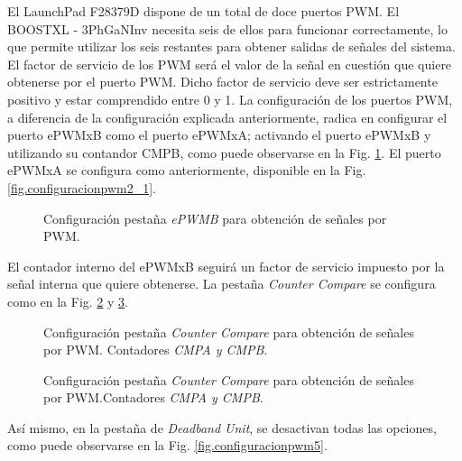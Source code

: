 \documentclass{report}
\begin{document}
El LaunchPad F28379D dispone de un total de doce puertos PWM. El BOOSTXL - 3PhGaNInv necesita seis de ellos para funcionar correctamente, lo que permite utilizar los seis restantes para obtener salidas de señales del sistema. El factor de servicio de los PWM será el valor de la señal en cuestión que quiere obtenerse por el puerto PWM. Dicho factor de servicio deve ser estrictamente positivo y estar comprendido entre 0 y 1.
La configuración de los puertos PWM, a diferencia de la configuración explicada anteriormente, radica en configurar el puerto ePWMxB como el puerto ePWMxA; activando el puerto ePWMxB y utilizando su contandor CMPB, como puede observarse en la Fig. \ref{fig.configuracionpwm6}. El puerto ePWMxA se configura como anteriormente, disponible en la Fig. \ref{fig.configuracionpwm2_1}.

\begin{figure}[!h]
    \begin{center}
    \caption{Configuración pestaña \textit{ePWMB} para obtención de señales por PWM.}
    \label{fig.configuracionpwm6} 
    \end{center}
\end{figure}
El contador interno del ePWMxB seguirá un factor de servicio impuesto por la señal interna que quiere obtenerse. La pestaña \textit{Counter Compare} se configura como en la Fig. \ref{fig.configuracionpwm7} y \ref{fig.configuracionpwm8}. 

\begin{figure}[!h]
    \begin{center}
    \caption{Configuración pestaña \textit{Counter Compare} para obtención de señales por PWM. Contadores \textit{CMPA y CMPB}.}
    \label{fig.configuracionpwm7} 
    \end{center}
\end{figure}

\begin{figure}[!h]
    \begin{center}
    \caption{Configuración pestaña \textit{Counter Compare} para obtención de señales por PWM.Contadores \textit{CMPA y CMPB}.}
    \label{fig.configuracionpwm8} 
    \end{center}
\end{figure}

Así mismo, en la pestaña de \textit{Deadband Unit}, se desactivan todas las opciones, como puede observarse en la Fig. \ref{fig.configuracionpwm5}.
\end{document}

